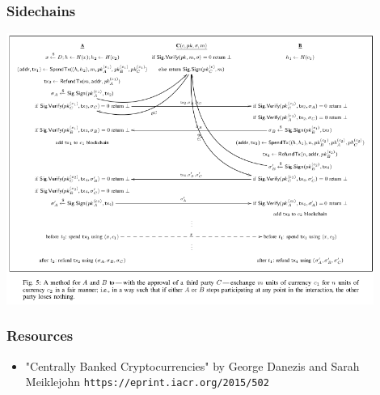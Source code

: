 \documentclass{beamer}
\begin{document}
\begin{frame}[fragile]
\frametitle{Sidechains}
\includegraphics[width=0.9\textwidth]{rscoin_sidechains.png}
\end{frame}

\begin{frame}[fragile]
\frametitle{Resources}
\begin{itemize}
\item "Centrally Banked Cryptocurrencies" by George Danezis and Sarah Meiklejohn \verb|https://eprint.iacr.org/2015/502|
\end{itemize}
\end{frame}
\end{document}
